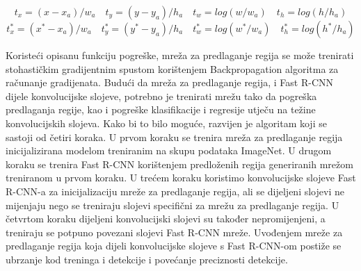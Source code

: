 \[
	t_x = (x - x_a) / w_a \quad t_y = (y - y_a) / h_a \quad
	t_w = log(w / w_a) \quad t_h = log(h / h_a)
\]
\[
	t_x^* = (x^* - x_a) / w_a \quad t_y^* = (y^* - y_a) / h_a \quad
	t_w^* = log(w^* / w_a) \quad t_h^* = log(h^* / h_a)
\]

Koristeći opisanu funkciju pogreške, mreža za predlaganje regija se može trenirati stohastičkim gradijentnim spustom korištenjem Backpropagation algoritma za računanje gradijenata.
Budući da mreža za predlaganje regija, i Fast R-CNN dijele konvolucijske slojeve, potrebno je trenirati mrežu tako da pogreška predlaganja regije, kao i pogreške klasifikacije i regresije utječu na težine konvolucijskih slojeva. Kako bi to bilo moguće, razvijen je algoritam koji se sastoji od četiri koraka. U prvom koraku se trenira mreža za predlaganje regija inicijalizirana modelom treniranim na skupu podataka ImageNet. U drugom koraku se trenira Fast R-CNN korištenjem predloženih regija generiranih mrežom treniranom u prvom koraku. U trećem koraku koristimo konvolucijske slojeve Fast R-CNN-a za inicijalizaciju mreže za predlaganje regija, ali se dijeljeni slojevi ne mijenjaju nego se treniraju slojevi specifični za mrežu za predlaganje regija. U četvrtom koraku dijeljeni konvolucijski slojevi su također nepromijenjeni, a treniraju se potpuno povezani slojevi Fast R-CNN mreže.
Uvođenjem mreže za predlaganje regija koja dijeli konvolucijske slojeve s Fast R-CNN-om postiže se ubrzanje kod treninga i detekcije i povećanje preciznosti detekcije.
	